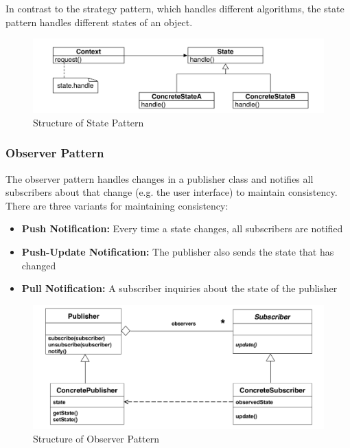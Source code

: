 In contrast to the strategy pattern, which handles different algorithms, the state pattern handles different states of an object.

\begin{figure}[h]
	\centering
	\includegraphics[width=\linewidth]{images/pattern_state.png}
	\caption{Structure of State Pattern}
\end{figure}
\newpage

\subsubsection{Observer Pattern}
The observer pattern handles changes in a publisher class and notifies all subscribers about that change (e.g. the user interface) to maintain consistency.
There are three variants for maintaining consistency:
\begin{itemize}
  \item \textbf{Push Notification:} Every time a state changes, all subscribers are notified
  \item \textbf{Push-Update Notification:} The publisher also sends the state that has changed
  \item \textbf{Pull Notification:} A subscriber inquiries about the state of the publisher
\end{itemize}

\begin{figure}[h]
	\centering
	\includegraphics[width=\linewidth]{images/pattern_observer.png}
	\caption{Structure of Observer Pattern}
\end{figure}
\newpage

